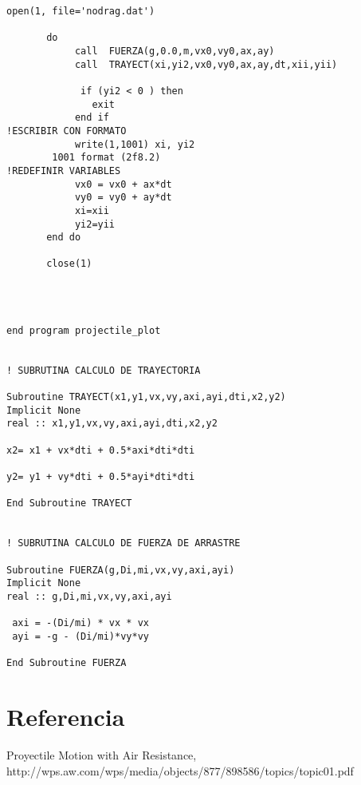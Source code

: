 \documentclass{article}
\begin{document}
\begin{Verbatim}[frame=single]
       open(1, file='nodrag.dat')   
 
       do              
            call  FUERZA(g,0.0,m,vx0,vy0,ax,ay)
            call  TRAYECT(xi,yi2,vx0,vy0,ax,ay,dt,xii,yii)

             if (yi2 < 0 ) then
               exit
            end if
!ESCRIBIR CON FORMATO
            write(1,1001) xi, yi2
		1001 format (2f8.2)
!REDEFINIR VARIABLES
            vx0 = vx0 + ax*dt
            vy0 = vy0 + ay*dt
            xi=xii
            yi2=yii
       end do   
       
       close(1)

       

  
end program projectile_plot 


! SUBRUTINA CALCULO DE TRAYECTORIA

Subroutine TRAYECT(x1,y1,vx,vy,axi,ayi,dti,x2,y2)
Implicit None
real :: x1,y1,vx,vy,axi,ayi,dti,x2,y2

x2= x1 + vx*dti + 0.5*axi*dti*dti

y2= y1 + vy*dti + 0.5*ayi*dti*dti

End Subroutine TRAYECT


! SUBRUTINA CALCULO DE FUERZA DE ARRASTRE

Subroutine FUERZA(g,Di,mi,vx,vy,axi,ayi)
Implicit None
real :: g,Di,mi,vx,vy,axi,ayi

 axi = -(Di/mi) * vx * vx
 ayi = -g - (Di/mi)*vy*vy

End Subroutine FUERZA

\end{Verbatim}

\section{Referencia}

Proyectile Motion with Air Resistance,\\ http://wps.aw.com/wps/media/objects/877/898586/topics/topic01.pdf
\end{document}
